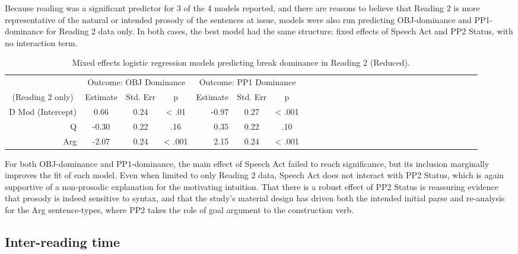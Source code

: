 \documentclass[11pt,oneside]{book}
\begin{document}
Because reading was a significant predictor for 3 of the 4 models reported, and there are reasons to believe that Reading 2 is more representative of the natural or intended prosody of the sentences at issue, models were also run predicting OBJ-dominance and PP1-dominance for Reading 2 data only. In both cases, the best model had the same structure: fixed effects of Speech Act and PP2 Status, with no interaction term.

\begin{table}[!h]

\caption{\label{tab:r2dom}Mixed effects logistic regression models predicting break dominance in Reading 2 (Reduced).}
\centering
\begin{tabular}{rcccrcccrcccrcccrcccrcccrccc}
\toprule
\multicolumn{1}{c}{ } & \multicolumn{3}{c}{Outcome: OBJ Dominance} & \multicolumn{3}{c}{Outcome: PP1 Dominance} \\
\cmidrule(l{3pt}r{3pt}){2-4} \cmidrule(l{3pt}r{3pt}){5-7}
\multicolumn{1}{c}{(Reading 2 only)} & \multicolumn{1}{c}{Estimate} & \multicolumn{1}{c}{Std. Err} & \multicolumn{1}{c}{p} & \multicolumn{1}{c}{Estimate} & \multicolumn{1}{c}{Std. Err} & \multicolumn{1}{c}{p}\\
\midrule
D Mod (Intercept) & 0.66 & 0.24 & < .01 & -0.97 & 0.27 & < .001\\
Q & -0.30 & 0.22 & .16 & 0.35 & 0.22 & .10\\
Arg & -2.07 & 0.24 & < .001 & 2.15 & 0.24 & < .001\\
\bottomrule
\end{tabular}
\end{table}

For both OBJ-dominance and PP1-dominance, the main effect of Speech Act failed to reach significance, but its inclusion marginally improves the fit of each model. Even when limited to only Reading 2 data, Speech Act does not interact with PP2 Status, which is again supportive of a non-prosodic explanation for the motivating intuition. That there is a robust effect of PP2 Status is reassuring evidence that prosody is indeed sensitive to syntax, and that the study's material design has driven both the intended initial parse and re-analysis for the Arg sentence-types, where PP2 takes the role of goal argument to the construction verb.

\hypertarget{irt}{%
\subsection{Inter-reading time}\label{irt}}
\end{document}

